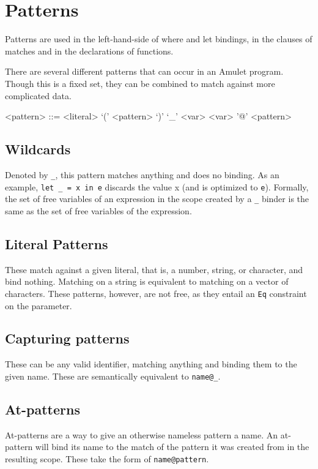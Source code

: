 \section{Patterns}
Patterns are used in the left-hand-side of where and let bindings, in the clauses of matches and in the declarations of functions.

There are several different patterns that can occur in an Amulet program. Though this is a fixed set, they can be combined to match against more complicated data.

\begin{grammar}
<pattern> ::= <literal>
         \alt `(' <pattern> `)'
         \alt `_'
         \alt <var>
         \alt <var> '@' <pattern>
\end{grammar}

\subsection{Wildcards}
Denoted by \texttt{_}, this pattern matches anything and does no binding. As an example, \texttt{let _ = x in e} discards the value x (and is optimized to \texttt{e}). Formally, the set of free variables of an expression in the scope created by a \texttt{_} binder is the same as the set of free variables of the expression.

\subsection{Literal Patterns}
These match against a given literal, that is, a number, string, or character, and bind nothing. Matching on a string is equivalent to matching on a vector of characters. These patterns, however, are not free, as they entail an \texttt{Eq} constraint on the parameter.

\subsection{Capturing patterns}
These can be any valid identifier, matching anything and binding them to the given name. These are semantically equivalent to \texttt{name@_}.

\subsection{At-patterns}
At-patterns are a way to give an otherwise nameless pattern a name. An at-pattern will bind its name to the match of the pattern it was created from in the resulting scope. These take the form of \texttt{name@pattern}.

